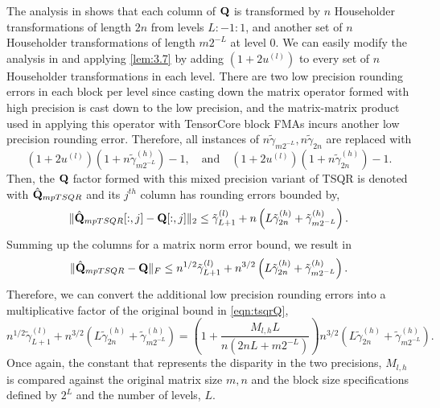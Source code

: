 The analysis in \cite{Mori2012} shows that each column of $\mathbf{Q}$ is transformed by $n$ Householder transformations of length $2n$ from levels $L:-1:1$, and another set of $n$ Householder transformations of length $m2^{-L}$ at level $0$.
We can easily modify the analysis in \cite{Mori2012} and applying \cref{lem:3.7} by adding $(1+2u^{(l)})$ to every set of $n$ Householder transformations in each level.
There are two low precision rounding errors in each block per level since casting down the matrix operator formed with high precision is cast down to the low precision, and the matrix-matrix product used in applying this operator with TensorCore block FMAs incurs another low precision rounding error. 
Therefore, all instances of $n\tilde{\gamma}_{m2^{-L}},n\tilde{\gamma}_{2n}$ are replaced with \[(1+2u^{(l)})(1+n\tilde{\gamma}_{m2^{-L}}^{(h)})-1,\quad\text{and}\quad (1+2u^{(l)})(1+n\tilde{\gamma}_{2n}^{(h)})-1.\]
Then, the $\mathbf{Q}$ factor formed with this mixed precision variant of TSQR is denoted with $\hat{\mathbf{Q}}_{mpTSQR}$ and its $j^{th}$ column has rounding errors bounded by,
\begin{equation}
\|\hat{\bb{Q}}_{mpTSQR}[:,j] - \bb{Q}[:,j]\|_2 \leq \tilde{\gamma}_{L+1}^{(l)}+n\left(L\tilde{\gamma}_{2n}^{(h)}+\tilde{\gamma}_{m2^{-L}}^{(h)}\right)\label{eqn:mpTSQR1}.
\end{equation}
Summing up the columns for a matrix norm error bound, we result in 
\begin{equation}
	\|\hat{\bb{Q}}_{mpTSQR} - \bb{Q}\|_F \leq n^{1/2}\tilde{\gamma}_{L+1}^{(l)}+n^{3/2}\left(L\tilde{\gamma}_{2n}^{(h)}+\tilde{\gamma}_{m2^{-L}}^{(h)}\right).\label{eqn:mpTSQR2}
\end{equation}
Therefore, we can convert the additional low precision rounding errors into a multiplicative factor of the original bound in \cref{eqn:tsqrQ},
\begin{equation}
	n^{1/2}\tilde{\gamma}_{L+1}^{(l)}+n^{3/2}\left(L\tilde{\gamma}_{2n}^{(h)}+\tilde{\gamma}_{m2^{-L}}^{(h)}\right) = \left(1+ \frac{M_{l,h}L}{n(2nL+m2^{-L})}\right)n^{3/2}\left(L\tilde{\gamma}_{2n}^{(h)}+\tilde{\gamma}_{m2^{-L}}^{(h)}\right).
\end{equation}
Once again, the constant that represents the disparity in the two precisions, $M_{l,h}$ is compared against the original matrix size $m,n$ and the block size specifications defined by $2^{L}$ and the number of levels, $L$.
